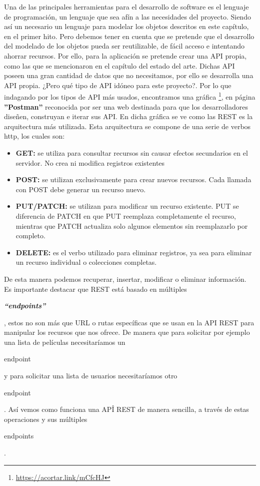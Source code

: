 Una de las principales herramientas para el desarrollo de software es el lenguaje de programación, un lenguaje que sea afín a las necesidades del proyecto. Siendo así un necesario un lenguaje para modelar los objetos descritos en este capítulo, en el primer hito. Pero debemos tener en cuenta que se pretende que el desarrollo del modelado de los objetos pueda ser reutilizable, de fácil acceso e intentando ahorrar recursos. Por ello, para la aplicación se pretende crear una API propia, como las que se mencionaron en el capítulo del estado del arte. Dichas API poseen una gran cantidad de datos que no necesitamos, por ello se desarrolla una API propia. ¿Pero qué tipo de API idóneo para este proyecto?. Por lo que indagando por los tipos de API más usados, encontramos una gráfica \footnote{\url{https://acortar.link/mCfcHJ}}, en página \textbf{''Postman''} reconocida por ser una web destinada para que los desarrolladores diseñen, construyan e iterar sus API. En dicha gráfica se ve como las REST es la arquitectura más utilizada. Esta arquitectura se compone de una serie de verbos http, los cuales son: 
\begin{itemize}
\item \textbf{GET:} se utiliza para consultar recursos sin causar efectos secundarios en el servidor. No crea ni modifica registros existentes
\item \textbf{POST:} se utilizan exclusivamente para crear nuevos recursos. Cada llamada con POST debe generar un recurso nuevo.
\item \textbf{PUT/PATCH:} se utilizan para modificar un recurso existente. PUT se diferencia de PATCH en que PUT reemplaza completamente el recurso, mientras que PATCH actualiza solo algunos elementos sin reemplazarlo por completo.
\item \textbf{DELETE:} es el verbo utilizado para eliminar registros, ya sea para eliminar un recurso individual o colecciones completas.
\end{itemize}

De esta manera podemos recuperar, insertar, modificar o eliminar información. Es importante destacar que REST está basado en múltiples \begin{otherlanguage}{english}\textit{\textbf{``endpoints''}}\end{otherlanguage}, estos no son más que URL o rutas específicas que se usan en la API REST para manipular los recursos que nos ofrece. De manera que para solicitar por ejemplo una lista de películas necesitaríamos un \begin{otherlanguage}{english}endpoint\end{otherlanguage} y para solicitar una lista de usuarios necesitaríamos otro \begin{otherlanguage}{english}endpoint\end{otherlanguage}. Así vemos como funciona una APÎ REST de manera sencilla, a través de estas operaciones y sus múltiples \begin{otherlanguage}{english}endpoints\end{otherlanguage}.

